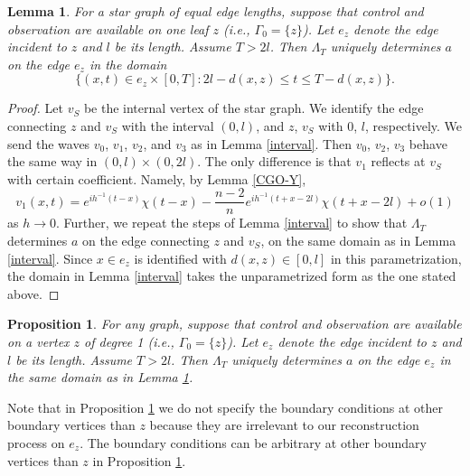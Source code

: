 \documentclass[11pt]{amsart}
\theoremstyle{definition}
\theoremstyle{plain}
\newtheorem{lemma}[definition]{Lemma}
\newtheorem{proposition}[definition]{Proposition}
\numberwithin{equation}{section}
\begin{document}
\begin{lemma} \label{star-equal}
For a star graph of equal edge lengths, suppose that control and observation are available on one leaf $z$ (i.e., $\Gamma_0=\{z\}$).
Let $e_z$ denote the edge incident to $z$ and $l$ be its length.
Assume $T>2l$.
Then $\Lambda_T$ uniquely determines $a$ on the edge $e_z$ in the domain
$$\Big\{(x,t)\in e_z\times [0,T]: 2l-d(x,z)\leq t\leq T-d(x,z)\Big\}.$$
\end{lemma}

\begin{proof}
    Let $v_S$ be the internal vertex of the star graph. We identify the edge connecting $z$ and $v_S$ with the interval $(0,l)$, and $z$, $v_S$ with $0$, $l$, respectively. We send the waves $v_0$, $v_1$, $v_2$, and $v_3$ as in Lemma \ref{interval}. Then $v_0$, $v_2$, $v_3$ behave the same way in $(0,l)\times (0,2l)$. The only difference is that $v_1$ reflects at $v_S$ with certain coefficient. Namely, by Lemma \ref{CGO-Y},
    \begin{equation}
        v_1(x,t) = e^{ih^{-1}(t - x)} \chi(t - x)  - \frac{n - 2}{n}e^{ih^{-1}(t + x -2l)} \chi(t + x -2l) + o(1)
    \end{equation}
    as $h\rightarrow 0$. Further, we repeat the steps of Lemma \ref{interval} to show that $\Lambda_T$ determines $a$ on the edge connecting $z$ and $v_S$, on the same domain as in Lemma \ref{interval}.
    {Since $x\in e_z$ is identified with $d(x,z)\in [0,l]$ in this parametrization, the domain in Lemma \ref{interval} takes the unparametrized form as the one stated above.}
\end{proof}


\begin{proposition} \label{star-diff}
For any graph, suppose that control and observation are available on a vertex $z$ of degree 1 (i.e., $\Gamma_0=\{z\}$). {Let $e_z$ denote the edge incident to $z$ and $l$ be its length.
Assume $T>2l$.
Then $\Lambda_T$ uniquely determines $a$ on the edge $e_z$ in the same domain as in Lemma \ref{star-equal}.}
\end{proposition}

Note that in Proposition \ref{star-diff} we do not specify the boundary conditions at other boundary vertices than $z$ because they are irrelevant to our reconstruction process on $e_z$. The boundary conditions can be arbitrary at other boundary vertices than $z$ in Proposition \ref{star-diff}.
\end{document}
